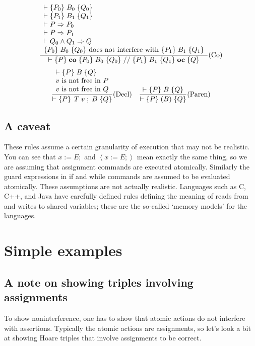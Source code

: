 \documentclass[11pt]{article}%
\begin{document}
\[
\frac{%
\begin{array}
[c]{l}%
\vdash\{P_{0}\}\;B_{0}\;\{Q_{0}\}\\
\vdash\{P_{1}\}\;B_{1}\;\{Q_{1}\}\\
\vdash P\Rightarrow P_{0}\\
\vdash P\Rightarrow P_{1}\\
\vdash Q_{0}\wedge Q_{1}\Rightarrow Q\\
\{P_{0}\}\;B_{0}\;\{Q_{0}\}\text{ does not interfere with }\{P_{1}%
\}\;B_{1}\;\{Q_{1}\}
\end{array}
}{\vdash\{P\}\;\mathbf{co}\;\{P_{0}\}\;B_{0}\;\{Q_{0}\}\;//\;\{P_{1}%
\}\;B_{1}\;\{Q_{1}\}\;\mathbf{oc}\;\{Q\}}\text{(Co)}%
\]%
\[
\frac{%
\begin{array}
[c]{l}%
\vdash\{P\}\;B\;\{Q\}\\
v\text{ is not free in }P\\
v\text{ is not free in }Q
\end{array}
}{\vdash\left\{  P\right\}  \;T\;v\;;\;B\;\{Q\}}\text{(Decl)\quad}\frac
{\vdash\{P\}\;B\;\{Q\}}{\vdash\{P\}\;(B)\;\{Q\}}\text{(Paren)}%
\]


\subsection{A caveat\label{sec:caveat}}

These rules assume a certain granularity of execution that may not be
realistic. You can see that $x:=E;$ and $\left\langle x:=E;\right\rangle $
mean exactly the same thing, so we are assuming that assignment commands are
executed atomically. Similarly the guard expressions in if and while commands
are assumed to be evaluated atomically. These assumptions are not actually
realistic. Languages such as C, C++, and Java have carefully defined rules
defining the meaning of reads from and writes to shared variables; these are
the so-called `memory models' for the languages.

\section{Simple examples\label{simple}}

\subsection{A note on showing triples involving assignments}

To show noninterference, one has to show that atomic actions do not interfere
with assertions. Typically the atomic actions are assignments, so let's look a
bit at showing Hoare triples that involve assignments to be correct.
\end{document}
